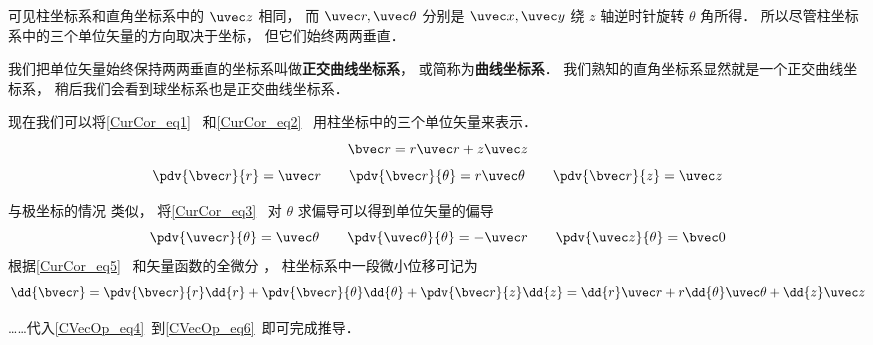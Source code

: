 可见柱坐标系和直角坐标系中的 $\uvec z$ 相同， 而 $\uvec r, \uvec \theta$ 分别是 $\uvec x, \uvec y$ 绕 $z$ 轴逆时针旋转 $\theta$ 角所得． 所以尽管柱坐标系中的三个单位矢量的方向取决于坐标， 但它们始终两两垂直．

我们把单位矢量始终保持两两垂直的坐标系叫做\textbf{正交曲线坐标系}， 或简称为\textbf{曲线坐标系}． 我们熟知的直角坐标系显然就是一个正交曲线坐标系， 稍后我们会看到球坐标系也是正交曲线坐标系．

现在我们可以将\autoref{CurCor_eq1}~ 和\autoref{CurCor_eq2}~ 用柱坐标中的三个单位矢量来表示．
\begin{equation}
\bvec r = r\uvec r + z\uvec z
\end{equation}
\begin{equation}
\pdv{\bvec r}{r} = \uvec r \qquad \pdv{\bvec r}{\theta} = r\uvec \theta \qquad \pdv{\bvec r}{z} = \uvec z\label{CylNab_eq5}
\end{equation}

与极坐标的情况 类似， 将\autoref{CurCor_eq3}~ 对 $\theta$ 求偏导可以得到单位矢量的偏导
\begin{equation}
\pdv{\uvec r}{\theta} = \uvec \theta \qquad
\pdv{\uvec \theta}{\theta} = -\uvec r \qquad
\pdv{\uvec z}{\theta} = \bvec 0
\end{equation}
根据\autoref{CurCor_eq5}~ 和矢量函数的全微分%
， 柱坐标系中一段微小位移可记为
\begin{equation}\label{CylNab_eq7}
\dd{\bvec r} = \pdv{\bvec r}{r}\dd{r} + \pdv{\bvec r}{\theta}\dd{\theta} + \pdv{\bvec r}{z}\dd{z} = \dd{r}\uvec r + r\dd{\theta} \uvec \theta + \dd{z} \uvec z
\end{equation}


……代入\autoref{CVecOp_eq4}~到\autoref{CVecOp_eq6}~即可完成推导．
